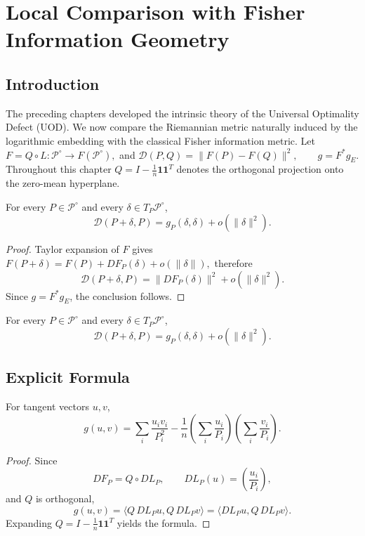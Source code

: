 \chapter[Local Comparison with Fisher]{Local Comparison with Fisher Information Geometry}
\section{Introduction}
The preceding chapters developed the intrinsic theory of the Universal
Optimality Defect (UOD). We now compare the Riemannian metric naturally
induced by the logarithmic embedding with the classical Fisher
information metric.
Let
$F=Q\circ L:\mathcal P^\circ\rightarrow F(\mathcal P^\circ),$
and
$\mathcal D(P,Q)=\|F(P)-F(Q)\|^2, \qquad g=F^{*}g_E.$
Throughout this chapter \(Q=I-\frac1n\mathbf{11}^T\) denotes the
orthogonal projection onto the zero-mean hyperplane.
\begin{theorem}\label{ch:thm:25-1}
\begin{theorem}

For every \(P\in\mathcal P^\circ\) and every
\(\delta\in T_P\mathcal P^\circ\),
\[ \mathcal D(P+\delta,P) =
g_P(\delta,\delta) + o(\|\delta\|^2). \]
\end{theorem}
\begin{proof}
Taylor expansion of \(F\) gives
$F(P+\delta)=F(P)+DF_P(\delta)+o(\|\delta\|),$
therefore
\[ \mathcal D(P+\delta,P) =
\|DF_P(\delta)\|^2 + o(\|\delta\|^2). \]
Since \(g=F^{*}g_E\), the conclusion follows. 
\end{proof}
\end{theorem}



\begin{theorem}
\label{ch:thm:25-1}
For every \(P\in\mathcal P^\circ\) and every
\(\delta\in T_P\mathcal P^\circ\),
\[ \mathcal D(P+\delta,P) =
g_P(\delta,\delta) + o(\|\delta\|^2). \]
\end{theorem}

\section{Explicit Formula}
\begin{proposition}
\label{ch:prop:25-2}
For tangent vectors \(u,v\),
\[ g(u,v) = \sum_i\frac{u_iv_i}{P_i^2} -
\frac1n
\left(\sum_i\frac{u_i}{P_i}\right)
\left(\sum_i\frac{v_i}{P_i}\right). \]
\end{proposition}
\begin{proof}
Since
\[ DF_P=Q\circ DL_P, \qquad
DL_P(u)=\left(\frac{u_i}{P_i}\right), \]
and \(Q\) is orthogonal,
\[ g(u,v) = \langle Q\,DL_P u,Q\,DL_P v\rangle =
\langle DL_P u,Q\,DL_P v\rangle. \]
Expanding \(Q=I-\frac1n\mathbf{11}^T\) yields the formula. 
\end{proof}
